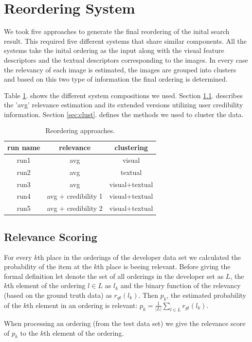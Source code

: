 \documentclass{acm_proc_article-me}
\begin{document}
\section{Reordering System}

We took five approaches to generate the final reordering of the inital search result. This required five different systems that share similar components. All the systems take the inital ordering as the input along with the visual feature descriptors and the textual descriptors corresponding to the images. In every case the relevancy of each image is estimated, the images are grouped into clusters and based on this two type of information the final ordering is determined.

Table \ref{table:runs}. shows the different system compositions we used. Section \ref{sec:relevance}. describes the 'avg' relevance estimation and its extended versions utilizing user credibility information. Section \ref{sec:clust}. defines the methods we used to cluster the data.

\begin{table}[h]
\centering
\begin{tabular}{|c|c|c|}
	\hline 
	run name & relevance & clustering\tabularnewline
	\hline 
	\hline 
	run1 & avg & visual\tabularnewline
	\hline 
	run2 & avg & textual\tabularnewline
	\hline 
	run3 & avg & visual+textual\tabularnewline
	\hline 
	run4 & avg + credibility 1 & visual+textual\tabularnewline
	\hline 
	run5 & avg + credibility 2 & visual+textual\tabularnewline
	\hline 
\end{tabular}
\caption{Reordering approaches.}
\label{table:runs}
\end{table}

\subsection{Relevance Scoring}
\label{sec:relevance}

For every $k$th place in the orderings of the developer data set we calculated the probability of the item at the $k$th place is beeing relevant. Before giving the formal definition let denote the set of all orderings in the developer set as $L$, the $k$th element of the ordering $l \in L$ as $l_k$ and the binary function of the relevancy (based on the ground truth data) as $r_{gt}(l_k)$. Then $p_k$, the estimated probability of the $k$th element in an ordering is relevant:
$p_k = \frac{1}{|L|}\sum_{l \in L}r_{gt}(l_k)$.

When processing an ordering (from the test data set) we give the relevance score of $p_k$ to the $k$th element of the ordering.
\end{document}
